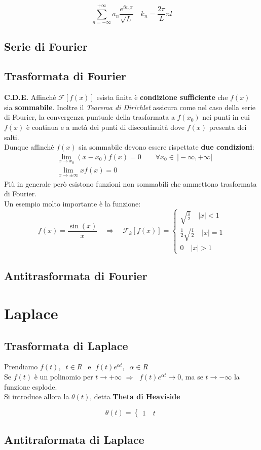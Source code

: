 \documentclass[x11names]{article}
\begin{document}
\[
	\sum_{n=-\infty}^{+\infty} a_n \frac{e^{ik_{n}x}}{\sqrt{L}} \quad k_n = \frac{2\pi}{L}nl
\]

\subsection{Serie di Fourier}
\subsection{Trasformata di Fourier}
\textbf{C.D.E.} Affinché $\mathscr{F}[f(x)]$ esista finita è \textbf{condizione sufficiente} che $f(x)$ sia \textbf{sommabile}. Inoltre il \textit{Teorema di Dirichlet} assicura come nel caso della serie di Fourier, la convergenza puntuale della trasformata a $f(x_0)$ nei punti in cui $f(x)$ è continua e a metà dei punti di discontinuità dove $f(x)$ presenta dei salti.\\
Dunque affinché $f(x)$ sia sommabile devono essere rispettate \textbf{due condizioni}:
\begin{align}
	&\lim_{x \to x_0}(x-x_0)f(x) = 0 \quad\quad \forall x_0 \in \, ]-\infty,+\infty[ \\
	&\lim_{x \to \pm\infty}xf(x) =  0
\end{align}
Più in generale però esistono funzioni non sommabili che ammettono trasformata di Fourier. \\Un esempio molto importante è la funzione:
\[
	f(x)=\frac{\sin(x)}{x} \quad\Longrightarrow\quad \mathscr{F}_{k}[f(x)] = \begin{cases}
		\sqrt{\frac{1}{2}}\quad |x|<1 \\
		\frac{1}{2}\sqrt{\frac{1}{2}}\quad |x|=1 \\
		0 \quad |x|>1 
	\end{cases} 
\] 


\subsection{Antitrasformata di Fourier}

\section{Laplace}
\subsection{Trasformata di Laplace}
Prendiamo $f(t), \;\; t\in R\;\,$ e $\;f(t)e^{\alpha t},\;\; \alpha \in R$ \\
Se $f(t)$ è un polinomio per $t \to +\infty$ $\Longrightarrow$ $\;f(t)e^{\alpha t} \to 0$, ma se $t \to -\infty$ la funzione esplode.\\Si introduce allora la $\theta(t)$, detta \textbf{Theta di Heaviside}

\[
	\theta(t) = \begin{cases}
		1 \quad t 
	\end{cases}
\]
\subsection{Antitraformata di Laplace}
\end{document}
